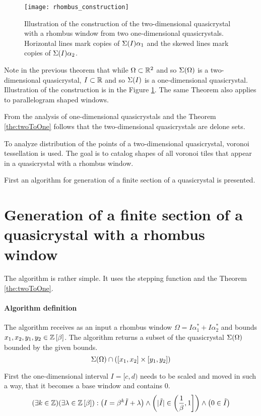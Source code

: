 \documentclass[text.tex]{subfiles}
\begin{document}
\begin{figure}[h]
\centering
\texttt{[image: rhombus\_construction]}
\caption{Illustration of the construction of the two-dimensional quasicrystal with a rhombus window from two one-dimensional quasicrystals. Horizontal lines mark copies of $\Sigma(I)\alpha_1$ and the skewed lines mark copies of $\Sigma(I)\alpha_2$.}
\label{fig:quasiRhombusConstruction}
\end{figure}

\begin{remark}
Note in the previous theorem that while $\Omega \subset \mathbb{R}^2$ and so $\Sigma(\Omega)$ is a two-dimensional quasicrystal, $I \subset \mathbb{R}$ and so $\Sigma(I)$ is a one-dimensional quasicrystal. Illustration of the construction is in the Figure \ref{fig:quasiRhombusConstruction}.
The same Theorem also applies to parallelogram shaped windows. 
\end{remark}

From the analysis of one-dimensional quasicrystals and the Theorem \ref{the:twoToOne} follows that the two-dimensional quasicrystals are delone sets.  

To analyze distribution of the points of a two-dimensional quasicrystal, voronoi tessellation is used. The goal is to catalog shapes of all voronoi tiles that appear in a quasicrystal with a rhombus window. 

First an algorithm for generation of a finite section of a quasicrystal is presented. 

%
\newpage
\section{Generation of a finite section of a quasicrystal with a rhombus window}%
The algorithm is rather simple. It uses the stepping function and the Theorem \ref{the:twoToOne}. 

\paragraph{Algorithm definition} The algorithm receives as an input a rhombus window $\Omega = I\alpha_1^\ast + I\alpha_2^\ast$ and bounds $x_1, x_2, y_1, y_2 \in \mathbb{Z}\left[\beta\right]$.
The algorithm returns a subset of the quasicrystal $\Sigma(\Omega)$ bounded by the given bounds.
$$\Sigma(\Omega)\cap([x_1,x_2]\times[y_1,y_2])$$

First the one-dimensional interval $I = [c,d)$ needs to be scaled and moved in such a way, that it becomes a base window and contains $0$.
$$(\exists k\in\mathbb{Z})(\exists \lambda\in\mathbb{Z}\left[\beta\right]) : \left(I = \beta^k\tilde{I}+\lambda\right) \wedge \left(|\tilde{I}| \in \left(\frac{1}{\beta},1\right] \right)\wedge \left(0\in\tilde{I}\right)$$
\end{document}

